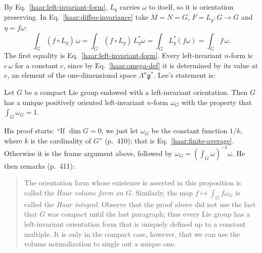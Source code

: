 By Eq.~\eqref{haar:left-invariant-form}, $L_g$ carries $\omega$ to itself, so
it is orientation preserving. In Eq.~\eqref{haar:diffeo-invariance} take
$M=N=G$, $F=L_g\colon G\to G$ and $\eta=f\omega$:
\begin{equation}\label{haar:left-invariant-integral}
 \int_G(f\circ L_g)\,\omega
 =\int_G(f\circ L_g)\,L_g^*\omega
 =\int_GL_g^*(f\omega)
 =\int_Gf\,\omega .
\end{equation}
The first equality is Eq.~\eqref{haar:left-invariant-form}. Every
left-invariant $n$-form is $c\,\omega$ for a constant $c$, since by
Eq.~\eqref{haar:omega-def} it is determined by its value at $e$, an element
of the one-dimensional space $\Lambda^n\mathfrak g^*$. Lee's statement is:
\begin{proposition}\label{haar:prop:lee-16-10}
Let $G$ be a compact Lie group endowed with a left-invariant orientation.
Then $G$ has a unique positively oriented left-invariant $n$-form
$\omega_G$ with the property that $\int_G\omega_G=1$.
\end{proposition}
His proof starts: ``If $\dim G=0$, we just let $\omega_G$ be the constant
function $1/k$, where $k$ is the cardinality of $G$'' (p.~410); that is
Eq.~\eqref{haar:finite-average}. Otherwise it is the frame argument above,
followed by $\omega_G=(\int_G\omega)^{-1}\omega$. He then remarks (p.~411):
\begin{quote}
The orientation form whose existence is asserted in this proposition is
called the \emph{Haar volume form on $G$}. Similarly, the map
$f\mapsto\int_Gf\omega_G$ is called the \emph{Haar integral}. Observe that
the proof above did not use the fact that $G$ was compact until the last
paragraph; thus every Lie group has a left-invariant orientation form that
is uniquely defined up to a constant multiple. It is only in the compact
case, however, that we can use the volume normalization to single out a
unique one.
\end{quote}

